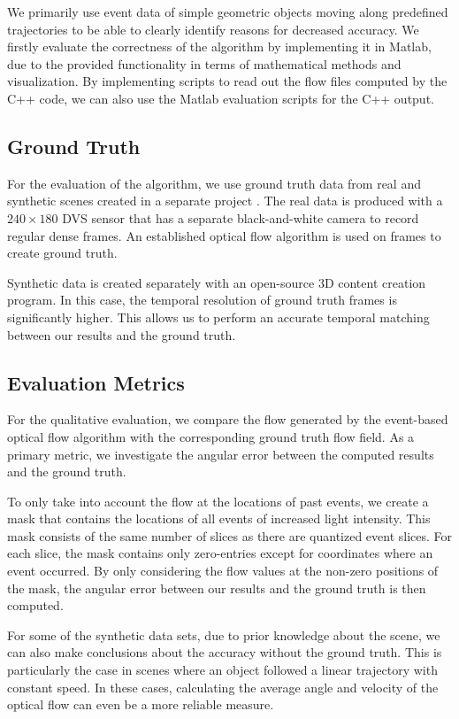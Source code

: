 We primarily use event data of simple geometric objects moving along predefined trajectories to be able to clearly identify reasons for decreased accuracy.
We firstly evaluate the correctness of the algorithm by implementing it in Matlab, due to the provided functionality in terms of mathematical methods and visualization.
By implementing scripts to read out the flow files computed by the C++ code, we can also use the Matlab evaluation scripts for the C++ output.
\subsection{Ground Truth}
For the evaluation of the algorithm, we use ground truth data from real and synthetic scenes created in a separate project \cite{Scherer2015}.
The real data is produced with a $240\times180$ DVS sensor that has a separate black-and-white camera to record regular dense frames.
An established optical flow algorithm is used on frames to create ground truth.


Synthetic data is created separately with an open-source 3D content creation program. 
In this case, the temporal resolution of ground truth frames is significantly higher. %
This allows us to perform an accurate temporal matching between our results and the ground truth.

\subsection{Evaluation Metrics}
For the qualitative evaluation, we compare the flow generated by the event-based optical flow algorithm with the corresponding ground truth flow field. As a primary metric, we investigate the angular error between the computed results and the ground truth. 

To only take into account the flow at the locations of past events, we create a mask that contains the locations of all events of increased light intensity.
This mask consists of the same number of slices as there are quantized event slices.
For each slice, the mask contains only zero-entries except for coordinates where an event occurred. 
By only considering the flow values at the non-zero positions of the mask, 
the angular error between our results and the ground truth is then computed.


For some of the synthetic data sets, due to prior knowledge about the scene, we can also make conclusions about the accuracy without the ground truth.
This is particularly the case in scenes where an object followed a linear trajectory with constant speed.
In these cases, calculating the average angle and velocity of the optical flow can even be a more reliable measure. 

